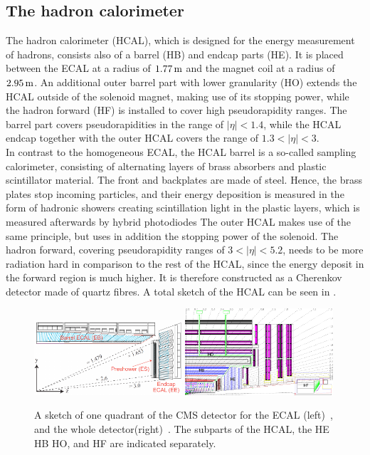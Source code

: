 \subsection{The hadron calorimeter}
The hadron calorimeter (HCAL), which is designed for the energy measurement of hadrons, consists also of a barrel (HB) and endcap parts (HE). It is placed between the ECAL at a radius of $1.77\,\text{m}$ and the magnet coil at a radius of $2.95\,\text{m}$. An additional outer barrel part with lower granularity (HO) extends the HCAL outside of the solenoid magnet, making use of its stopping power, while the hadron forward (HF) is installed to cover high pseudorapidity ranges. The barrel part covers pseudorapidities in the range of $|\eta|<1.4$, while the HCAL endcap together with the outer HCAL covers the range of $1.3<|\eta|<3$.\\
In contrast to the homogeneous ECAL, the HCAL barrel is a so-called sampling calorimeter, consisting of alternating layers of brass absorbers and plastic scintillator material. The front and backplates are made of steel. Hence, the brass plates stop incoming particles, and their energy deposition is measured in the form of hadronic showers creating scintillation light in the plastic layers, which is measured afterwards by hybrid photodiodes The outer HCAL makes use of the same principle, but uses in addition the stopping power of the solenoid. The hadron forward, covering pseudorapidity ranges of $3<|\eta|<5.2$, needs to be more radiation hard in comparison to the rest of the HCAL, since the energy deposit in the forward region is much higher. It is therefore constructed as a Cherenkov detector made of quartz fibres. A total sketch of the HCAL can be seen in .

\begin{figure}[tbp]
 \centering
 \includegraphics[width=0.49\textwidth]{figures/general/ecal}
 \includegraphics[width=0.49\textwidth]{figures/general/hcal}
 \caption{A sketch of one quadrant of the CMS detector for the ECAL (left)~\cite{ECALPicture}, and the whole detector(right)~\cite{CMS}. The subparts of the HCAL, the HE HB HO, and HF are indicated separately.}
 \label{fig:etaPlaneCMS}
\end{figure}


